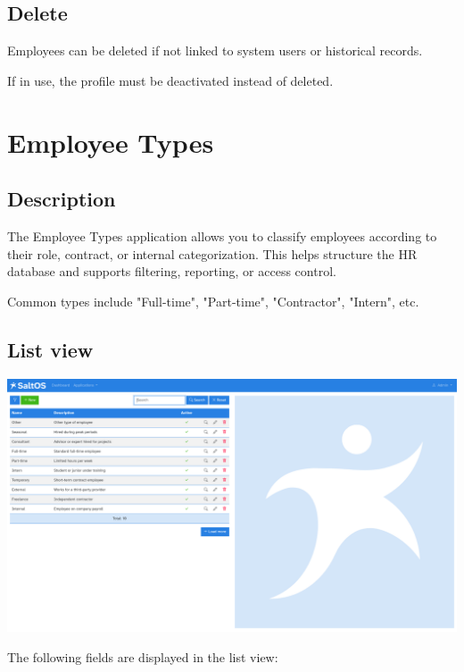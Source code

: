\documentclass[a4paper]{article}
\begin{document}
\hypertarget{toc110}{}
\subsection{Delete}

Employees can be deleted if not linked to system users or historical records.

If in use, the profile must be deactivated instead of deleted.


\hypertarget{toc111}{}
\section{Employee Types}

\hypertarget{toc112}{}
\subsection{Description}

The Employee Types application allows you to classify employees according to their role, contract, or internal categorization.
This helps structure the HR database and supports filtering, reporting, or access control.

Common types include "Full-time", "Part-time", "Contractor", "Intern", etc.

\hypertarget{toc113}{}
\subsection{List view}

\begin{center}\includegraphics[width=1\textwidth]{../ujest/snaps/test-screenshots-js-screenshots-hr-employees-types-list-en-us-1-snap.png}\end{center}

The following fields are displayed in the list view:
\end{document}
